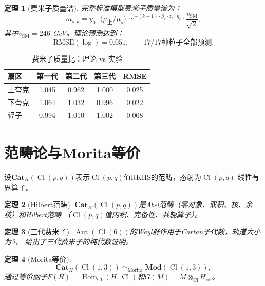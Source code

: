 \documentclass[12pt,a4paper]{ctexart}
\newtheorem{theorem}{定理}[section]
\newcommand{\Cl}{\operatorname{Cl}}
\newcommand{\Cat}{\mathbf{Cat}}
\newcommand{\Mod}{\mathbf{Mod}}
\newcommand{\Aut}{\operatorname{Aut}}
\newcommand{\Hom}{\operatorname{Hom}}
\begin{document}
\begin{theorem}[费米子质量谱]
\label{thm:mass}
完整标准模型费米子质量谱为：
\begin{equation}
m_{s,k} = y_0 \cdot \bigl(\mu_{\text{上}}/\mu_s\bigr) \cdot 
e^{-(k-1) \cdot \beta_s \cdot z_s \cdot \eta_s} \cdot \frac{v_{\text{SM}}}{\sqrt{2}},
\end{equation}
其中$v_{\text{SM}} = 246$ GeV。理论预测达到：
\begin{equation}
\text{RMSE}(\log) = 0.051,\qquad \text{17/17种粒子全部预测}.
\end{equation}
\end{theorem}

\begin{table}[h]
\centering
\caption{费米子质量比：理论 vs 实验}
\label{tab:masses}
\begin{tabular}{lcccc}
\hline
扇区 & 第一代 & 第二代 & 第三代 & RMSE \\
\hline
上夸克 & 1.045 & 0.962 & 1.000 & 0.025 \\
下夸克 & 1.064 & 1.032 & 0.996 & 0.022 \\
轻子 & 0.994 & 1.010 & 1.002 & 0.008 \\
\hline
\end{tabular}
\end{table}

\section{范畴论与Morita等价}
\label{sec:category}

设$\Cat_H(\Cl(p,q))$表示$\Cl(p,q)$值RKHS的范畴，态射为$\Cl(p,q)$-线性有界算子。

\begin{theorem}[Hilbert范畴]
$\Cat_H(\Cl(p,q))$是Abel范畴（零对象、双积、核、余核）和Hilbert范畴
（$\Cl(p,q)$值内积、完备性、共轭算子）。
\end{theorem}

\begin{theorem}[三代费米子]
$\Aut(\Cl(6))$的Weyl群作用于Cartan子代数，轨道大小为3，
给出了三代费米子的纯代数证明。
\end{theorem}

\begin{theorem}[Morita等价]
\begin{equation}
\Cat_H(\Cl(1,3)) \simeq_{\text{Morita}} \Mod(\Cl(1,3)),
\end{equation}
通过等价函子$F(H) = \Hom_{\Cl}(H, \Cl)$和$G(M) = M \otimes_{\Cl} H_{\text{ref}}$。
\end{theorem}
\end{document}
